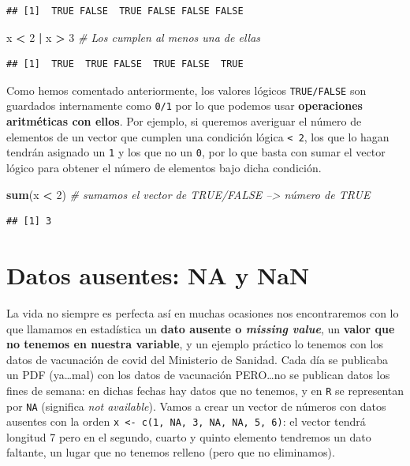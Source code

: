 \documentclass[11pt,]{book}
\newenvironment{Shaded}{\begin{snugshade}}{\end{snugshade}}
\newcommand{\CommentTok}[1]{\textcolor[rgb]{0.37,0.37,0.37}{\textit{#1}}}
\newcommand{\DecValTok}[1]{\textcolor[rgb]{0.06,0.06,0.06}{#1}}
\newcommand{\KeywordTok}[1]{\textcolor[rgb]{0.27,0.27,0.27}{\textbf{#1}}}
\newcommand{\NormalTok}[1]{#1}
\newcommand{\OperatorTok}[1]{\textcolor[rgb]{0.43,0.43,0.43}{\textbf{#1}}}
\newcommand{\StringTok}[1]{\textcolor[rgb]{0.5,0.5,0.5}{#1}}
\begin{document}
\begin{verbatim}
## [1]  TRUE FALSE  TRUE FALSE FALSE FALSE
\end{verbatim}

\begin{Shaded}
\begin{Highlighting}[]
\NormalTok{x }\OperatorTok{<}\StringTok{ }\DecValTok{2} \OperatorTok{|}\StringTok{ }\NormalTok{x }\OperatorTok{>}\StringTok{ }\DecValTok{3} \CommentTok{# Los cumplen al menos una de ellas}
\end{Highlighting}
\end{Shaded}

\begin{verbatim}
## [1]  TRUE  TRUE FALSE  TRUE FALSE  TRUE
\end{verbatim}

Como hemos comentado anteriormente, los valores lógicos \texttt{TRUE/FALSE} son guardados internamente como \texttt{0/1} por lo que podemos usar \textbf{operaciones aritméticas con ellos}. Por ejemplo, si queremos averiguar el número de elementos de un vector que cumplen una condición lógica \texttt{\textless{}\ 2}, los que lo hagan tendrán asignado un \texttt{1} y los que no un \texttt{0}, por lo que basta con sumar el vector lógico para obtener el número de elementos bajo dicha condición.

\begin{Shaded}
\begin{Highlighting}[]
\KeywordTok{sum}\NormalTok{(x }\OperatorTok{<}\StringTok{ }\DecValTok{2}\NormalTok{) }\CommentTok{# sumamos el vector de TRUE/FALSE --> número de TRUE}
\end{Highlighting}
\end{Shaded}

\begin{verbatim}
## [1] 3
\end{verbatim}

\hypertarget{ausentes}{%
\section{Datos ausentes: NA y NaN}\label{ausentes}}

La vida no siempre es perfecta así en muchas ocasiones nos encontraremos con lo que llamamos en estadística un \textbf{dato ausente o \emph{missing value}}, un \textbf{valor que no tenemos en nuestra variable}, y un ejemplo práctico lo tenemos con los datos de vacunación de covid del Ministerio de Sanidad. Cada día se publicaba un PDF (ya\ldots{}mal) con los datos de vacunación PERO\ldots{}no se publican datos los fines de semana: en dichas fechas hay datos que no tenemos, y en \texttt{R} se representan por \texttt{NA} (significa \emph{not available}). Vamos a crear un vector de números con datos ausentes con la orden \texttt{x\ \textless{}-\ c(1,\ NA,\ 3,\ NA,\ NA,\ 5,\ 6)}: el vector tendrá longitud 7 pero en el segundo, cuarto y quinto elemento tendremos un dato faltante, un lugar que no tenemos relleno (pero que no eliminamos).
\end{document}
